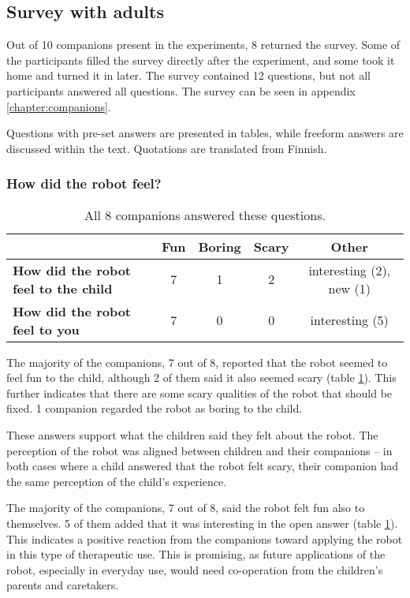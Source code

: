\subsection{Survey with adults}

Out of 10 companions present in the experiments, 8 returned the survey. Some of the participants filled the survey directly after the experiment, and some took it home and turned it in later. The survey contained 12 questions, but not all participants answered all questions. The survey can be seen in appendix \ref{chapter:companions}.

Questions with pre-set answers are presented in tables, while freeform answers are discussed within the text. Quotations are translated from Finnish.


\subsubsection{How did the robot feel?}

\begin{table}
  \centering
  \renewcommand{\arraystretch}{1.2}
  \begin{tabular}{|p{4cm}|c|c|c|c|}
    \hline
     & 
    \textbf{Fun} &
    \textbf{Boring} &
    \textbf{Scary} &
    \textbf{Other} \\\hline
    \textbf{How did the robot feel to the child} & 7 & 1 & 2 & interesting (2), new (1)\\ \hline
    \textbf{How did the robot feel to you} & 7 & 0 & 0 & interesting (5)\\ \hline
  \end{tabular}
  \caption{All 8 companions answered these questions.}
  \label{table:feeling}
\end{table}

The majority of the companions, 7 out of 8, reported that the robot seemed to feel fun to the child, although 2 of them said it also seemed scary (table \ref{table:feeling}). This further indicates that there are some scary qualities of the robot that should be fixed. 1 companion regarded the robot as boring to the child. 

These answers support what the children said they felt about the robot. The perception of the robot was aligned between children and their companions – in both cases where a child answered that the robot felt scary, their companion had the same perception of the child's experience.

The majority of the companions, 7 out of 8, said the robot felt fun also to themselves. 5 of them added that it was interesting in the open answer (table \ref{table:feeling}). This indicates a positive reaction from the companions toward applying the robot in this type of therapeutic use. This is promising, as future applications of the robot, especially in everyday use, would need co-operation from the children's parents and caretakers.


